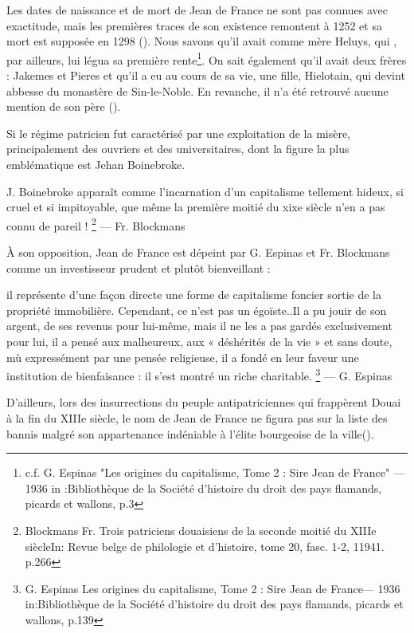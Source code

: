 Les dates de naissance et de mort de Jean de France ne sont pas connues avec exactitude, mais les premières traces de son existence remontent à 1252 et sa mort est supposée en 1298 (\cite{espinas_les_1933}). Nous savons qu'il avait comme mère Heluys, qui , par ailleurs, lui légua sa première rente\footnote{c.f. G. Espinas "Les origines du capitalisme, Tome 2 : Sire Jean de France" — 1936 in :Bibliothèque de la Société
d’histoire du droit des pays flamands, picards et wallons, p.3}.
On sait également qu'il  avait deux frères : Jakemes et Pieres et qu'il a eu au cours de sa vie, une fille, Hielotain, qui devint abbesse du monastère de Sin-le-Noble. En revanche, il n'a été retrouvé aucune mention de son père (\cite{espinas_les_1933}).

Si le régime patricien fut caractérisé par une exploitation de la misère, principalement des ouvriers et des universitaires, dont la figure la plus emblématique est Jehan Boinebroke. 
\begin{displayquote} 
    \og J. Boinebroke apparaît comme l'incarnation d'un capitalisme tellement hideux, si cruel et si impitoyable, que même la première moitié du xixe siècle n'en a pas connu de pareil ! \fg{}\footnote{ Blockmans Fr. \og Trois patriciens douaisiens de la seconde moitié du XIIIe siècle\fg In: Revue belge de philologie et d'histoire, tome 20, fasc. 1-2, 11941. p.266} — Fr. Blockmans
\end{displayquote}
\vspace{0,5cm}
À son opposition, Jean de France est dépeint par G. Espinas et Fr. Blockmans comme un investisseur prudent et plutôt bienveillant :
\begin{displayquote}
    \og [...] il représente d’une façon directe une forme de capitalisme foncier sortie de la propriété immobilière. Cependant, ce n’est pas un égoïste..Il a pu jouir de son argent, de ses revenus pour lui-même, mais il ne les a pas gardés exclusivement pour lui, il a pensé aux malheureux, aux « déshérités de la vie » et sans doute, mù expressément par une pensée religieuse, il a fondé en leur faveur une institution de bienfaisance : il s’est montré un riche charitable.\fg{} 
    \footnote{ G. Espinas \og Les origines du capitalisme, Tome 2 : Sire Jean de France\fg — 1936 in:Bibliothèque de la Société d'histoire du droit des pays flamands, picards et wallons, p.139 } — G. Espinas
\end{displayquote} 
\vspace{0,5cm}
D'ailleurs, lors des insurrections du peuple antipatriciennes qui frappèrent Douai à la fin du XIIIe siècle, le nom de Jean de France ne figura pas sur la liste des bannis malgré son appartenance indéniable à l'élite bourgeoise de la ville(\cite{espinas_les_1933}).

